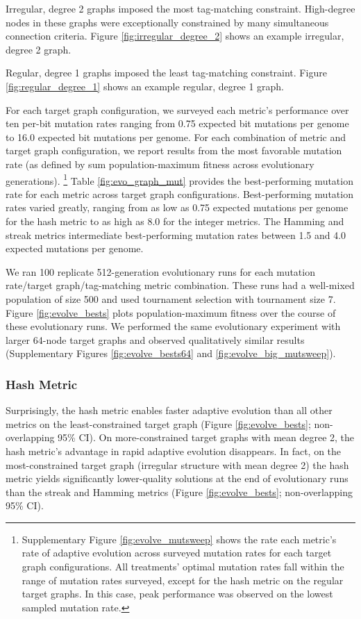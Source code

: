 Irregular, degree 2 graphs imposed the most tag-matching constraint.
High-degree nodes in these graphs were exceptionally constrained by many simultaneous connection criteria.
Figure \ref{fig:irregular_degree_2} shows an example irregular, degree 2 graph.

Regular, degree 1 graphs imposed the least tag-matching constraint.
Figure \ref{fig:regular_degree_1} shows an example regular, degree 1 graph.

For each target graph configuration, we surveyed each metric's performance over ten per-bit mutation rates ranging from 0.75 expected bit mutations per genome to 16.0 expected bit mutations per genome.
For each combination of metric and target graph configuration, we report results from the most favorable mutation rate (as defined by sum population-maximum fitness across evolutionary generations).%
\footnote{%
Supplementary Figure \ref{fig:evolve_mutsweep} shows the rate each metric's rate of adaptive evolution across surveyed mutation rates for each target graph configurations.
All treatments' optimal mutation rates fall within the range of mutation rates surveyed, except for the hash metric on the regular target graphs.
In this case, peak performance was observed on the lowest sampled mutation rate.
}
Table \ref{fig:evo_graph_mut} provides the best-performing mutation rate for each metric across target graph configurations.
Best-performing mutation rates varied greatly, ranging from as low as 0.75 expected mutations per genome for the hash metric to as high as 8.0 for the integer metrics.
The Hamming and streak metrics intermediate best-performing mutation rates between 1.5 and 4.0 expected mutations per genome.

We ran 100 replicate 512-generation evolutionary runs for each mutation rate/target graph/tag-matching metric combination.
These runs had a well-mixed population of size 500 and used tournament selection with tournament size 7.
Figure \ref{fig:evolve_bests} plots population-maximum fitness over the course of these evolutionary runs.
We performed the same evolutionary experiment with larger 64-node target graphs and observed qualitatively similar results (Supplementary Figures \ref{fig:evolve_bests64} and \ref{fig:evolve_big_mutsweep}).

\subsubsection{Hash Metric}

Surprisingly, the hash metric enables faster adaptive evolution than all other metrics on the least-constrained target graph (Figure \ref{fig:evolve_bests}; non-overlapping 95\% CI).
On more-constrained target graphs with mean degree 2, the hash metric's advantage in rapid adaptive evolution disappears.
In fact, on the most-constrained target graph (irregular structure with mean degree 2) the hash metric yields significantly lower-quality solutions at the end of evolutionary runs than the streak and Hamming metrics (Figure \ref{fig:evolve_bests}; non-overlapping 95\% CI).

